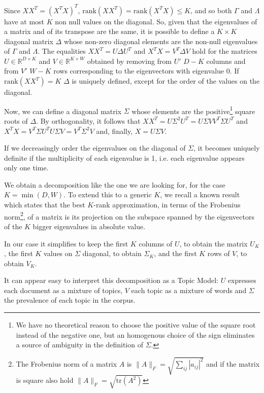 \documentclass[11pt, a4paper, oneside, openright]{book}
\begin{document}
Since $XX^T = (X^TX)^T$, $\text{rank}(XX^T) = \text{rank}(X^TX) \leq K$, and so both $\Gamma$ and $\Lambda$ have at most $K$ non null values on the diagonal.
So, given that the eigenvalues of a matrix and of its transpose are the same, it is possible to define a $K\times K$ diagonal matrix $\Delta$ whose non-zero diagonal elements are the non-null eigenvalues of $\Gamma$ and $\Lambda$.
The equalities $XX^T = U \Delta U^T$ and $X^TX=V^T \Delta V$ hold for the matrices $U \in \mathbb{R}^{D \times K}$ and $V \in \mathbb{R}^{K \times W}$ obtained by removing from $U'$ $D-K$ columns and from $V'$ $W-K$ rows corresponding to the eigenvectors with eigenvalue 0. If $\text{rank}(XX^T) = K$ $\Delta$ is uniquely defined, except for the order of the values on the diagonal.

Now, we can define a diagonal matrix $\Sigma$ whose elements are the positive\footnote{We have no theoretical reason to choose the positive value of the square root instead of the negative one, but an homogenous choice of the sign eliminates a source of ambiguity in the definition of $\Sigma$.} square roots of $\Delta$.
By orthogonality, it follows that $XX^T = U \Sigma^2 U^T = U\Sigma V V^T \Sigma U^T$ and $X^T X = V^T \Sigma U^T U \Sigma V = V^T \Sigma^2 V$ and, finally, $X = U \Sigma V$.

If we decreasingly order the eigenvalues on the diagonal of $\Sigma$, it becomes uniquely definite if the multiplicity of each eigenvalue is 1, i.e. each eigenvalue appears only one time.

We obtain a decomposition like the one we are looking for, for the case $K=\min(D,W)$. To extend this to a generic $K$, we recall a known result \parencite{eckart1936} which states that the best $K$-rank approximation, in terms of the Frobenius norm\footnote{The Frobenius norm of a matrix $A$ is $\|A\|_F=\sqrt{\sum_{ij}|a_{ij}|^2}$ and if the matrix is square also hold $\|A\|_F=\sqrt{\text{tr}(A^2)}$}, of a matrix is its projection on the subspace spanned by the eigenvectors of the $K$ bigger eigenvalues in absolute value. 

In our case it simplifies to keep the first $K$ columns of $U$, to obtain the matrix $U_K$, the first $K$ values on $\Sigma$ diagonal, to obtain $\Sigma_K$, and the first $K$ rows of $V$, to obtain $V_K$.

It can appear easy to interpret this decomposition as a Topic Model: $U$ expresses each document as a mixture of topics, $V$ each topic as a mixture of words and $\Sigma$ the prevalence of each topic in the corpus.
\end{document}
